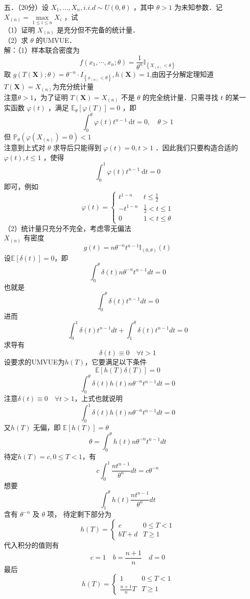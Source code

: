 \documentclass[UTF8]{ctexart}
\begin{document}
\noindent 五．（20分）设 $X_1, \ldots, X_n, i . i . d \sim U(0, \theta)$ ，其中 $\theta>1$ 为未知参数．记 $X_{(n)}=\max\limits_{1 \leq i \leq n} X_i$ ，试\\
（1）证明 $X_{(n)}$ 是充分但不完备的统计量．\\
（2）求 $\theta$ 的UMVUE．\\
解：（1）样本联合密度为
\[
f\left(x_1, \cdots, x_n ; \theta\right)=\frac{1}{\theta^n} \mathbb{I}_{\left\{X_{(n)} < \theta\right\}}
\]
取 $ g(T(\boldsymbol{X}) ; \theta)=\theta^{-n} \cdot I_{\left\{x_{(n)}<\theta\right\}}, h(\boldsymbol{X})=1$,由因子分解定理知道$T(\boldsymbol{X})=X_{(n)}$为充分统计量\\
注意$\theta>1$，为了证明 $T(\boldsymbol{X})=X_{(n)}$ 不是 $\theta$ 的完全统计量．只需寻找 $t$ 的某一实函数 $\varphi(t)$ ，满足 $\mathbb{E}_\theta[\varphi(T)]=0$ ，即
$$
\int_0^\theta \varphi(t) t^{n-1} \mathrm{~d} t=0, \quad \theta>1
$$
但 $\mathbb{P}_\theta\left(\varphi\left(X_{(n)}\right)=0\right)<1$ \\
注意到上式对 $\theta$ 求导后只能得到 $\varphi(t)=0, t>1$ ．因此我们只要构造合适的 $\varphi(t), t \leq 1$ ，使得
$$
\int_0^1 \varphi(t) t^{n-1} \mathrm{~d} t=0
$$
即可，例如 
\[
\varphi(t)=
\begin{cases}
	t^{1-n}  &  t \leq \frac{1}{2} \\
	-t^{1-n}  &  \frac{1}{2}<t\le 1\\
	0 & 1<t\le \theta
\end{cases}
\]
（2）统计量只充分不完全，考虑零无偏法\\
$X_{(n)}$ 有密度  
\[
g(t)=n \theta^{-n} t^{n-1} \mathbb{I}_{(0, \theta)}(t) 
\]
设$\mathbb{E}[\delta(t)]=0$，即
\[
\int_0^\theta \delta(t) n \theta^{-n} t^{n-1} d t=0 
\]
也就是
\[
\int_0^\theta \delta(t)  t^{n-1} d t=0 
\]
进而
\[
\int_0^1 \delta(t) t^{n-1} d t+\int_1^\theta \delta(t) t^{n-1} d t=0
\]
求导有
\[
\delta(t) \equiv 0 \quad \forall t>1
\]
设要求的UMVUE为$h(T)$，它要满足以下条件
\[
\mathbb{E}[h(T) \delta(T)]=0
\]
\[
\int_0^\theta \delta(t) h(t) n\theta^{-n} t^{n-1} d t=0
\]
注意$\delta(t) \equiv 0 \quad \forall t>1$，上式也就说明
\[
\int_0^1 \delta(t) h(t) n\theta^{-n} t^{n-1} d t=0
\]
又$ h(T)$ 无偏，即  $\mathbb{E}[h(T)]=\theta$ 
\[
\theta=\int_{0}^{\theta} h(t) n \theta^{-n} t^{n-1} d t
\]
待定$h(T)=c,0\le T<1$，有
\[
c \int_0^1 \frac{n t^{n-1}}{\theta^n} d t=c \theta^{-n}
\]
想要$$\int_1^\theta h(t) \frac{n t^{n-1}}{\theta^n} d t $$ 含有 $ \theta^{-n} $ 及 $ \theta $ 项， 
待定剩下部分为
\[
h(T)=
\begin{cases}
	c  &  0\le T<1 \\
	bT+d  &  T\ge 1
\end{cases}
\]
代入积分的值则有
\[
c=1\quad b=
\frac{n+1}{n} \quad d=0
\]
最后
\[
h(T)=
\begin{cases}
	1  &  0\le T<1 \\
	\frac{n+1}{n}T  &  T\ge 1
\end{cases}
\]
\end{document}
